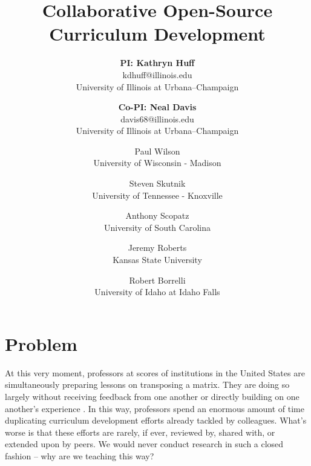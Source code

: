 \documentclass[11pt]{article}
\newcommand{\authorsite}{arfc.npre.illinois.edu}
\begin{document}
          \title{Collaborative Open-Source Curriculum Development}
          \author{\textbf{PI: Kathryn Huff}\\%
                  kdhuff@illinois.edu\\
                  University of Illinois at Urbana--Champaign
                  \and
           \textbf{Co-PI: Neal Davis}\\
                  davis68@illinois.edu\\
                   University of Illinois at Urbana--Champaign
                  \and
           Paul Wilson\\
                  University of Wisconsin - Madison 
                  \and
          Steven Skutnik\\
                  University of Tennessee - Knoxville
                  \and
          Anthony Scopatz\\
                  University of South Carolina 
                  \and
          Jeremy Roberts\\
                  Kansas State University 
                  \and
          Robert Borrelli\\
                  University of Idaho at Idaho Falls
          }
          \maketitle

          \pagestyle{fancy}
          \lhead{\textcolor{gray}{SIIP Full Proposal}}
          \rhead{\textcolor{gray}{Collaborative Open-Source Curriculum Development}}
          \renewcommand{\headrulewidth}{0pt}
          \renewcommand{\footrulewidth}{0pt}

          \section{Problem}
          At this very moment, professors at scores of institutions in the United States are 
          simultaneously preparing lessons on transposing a matrix.
          They are doing so largely without receiving feedback from one another 
          or directly building on one another's experience 
          \cite{green_building_2014}. In this way, 
          professors spend an enormous amount of time duplicating curriculum 
          development efforts already tackled by colleagues. What's worse is 
          that these efforts are rarely, if ever, reviewed by, shared with, or 
          extended upon by peers. We would never conduct research in such a 
          closed fashion -- why are we teaching this way?
          
\end{document}
